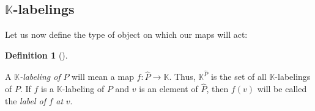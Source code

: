 \documentclass[numbers=enddot,12pt,final,onecolumn,notitlepage]{scrartcl}%
\theoremstyle{definition}
\newtheorem{defi}[theo]{Definition}
\newenvironment{definition}[1][]
{\begin{defi}[#1]\begin{leftbar}}
{\end{leftbar}\end{defi}}
\begin{document}
\subsection{$\mathbb{K}$-labelings}

Let us now define the type of object on which our maps will act:

\begin{definition}
\label{def.labeling}A $\mathbb{K}$\emph{-labeling of }$P$ will mean a map
$f:\widehat{P}\rightarrow\mathbb{K}$. Thus, $\mathbb{K}^{\widehat{P}}$ is the
set of all $\mathbb{K}$-labelings of $P$. If $f$ is a $\mathbb{K}$-labeling of
$P$ and $v$ is an element of $\widehat{P}$, then $f\left(  v\right)  $ will be
called the \emph{label of }$f$ \emph{at }$v$.
\end{definition}

\Needspace{20cm}
\end{document}

